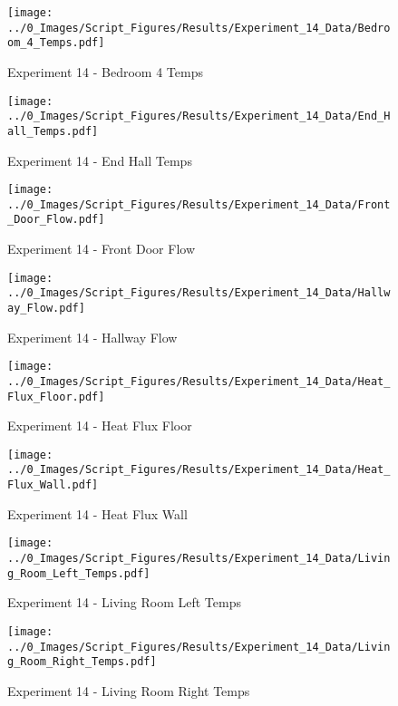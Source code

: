 	\begin{figure}[H]
		\centering
		\texttt{[image: ../0\_Images/Script\_Figures/Results/Experiment\_14\_Data/Bedroom\_4\_Temps.pdf]}
		\caption[]{Experiment 14 - Bedroom 4 Temps}
	\end{figure}
 
	\clearpage

	\begin{figure}[H]
		\centering
		\texttt{[image: ../0\_Images/Script\_Figures/Results/Experiment\_14\_Data/End\_Hall\_Temps.pdf]}
		\caption[]{Experiment 14 - End Hall Temps}
	\end{figure}
 

	\begin{figure}[H]
		\centering
		\texttt{[image: ../0\_Images/Script\_Figures/Results/Experiment\_14\_Data/Front\_Door\_Flow.pdf]}
		\caption[]{Experiment 14 - Front Door Flow}
	\end{figure}
 
	\clearpage

	\begin{figure}[H]
		\centering
		\texttt{[image: ../0\_Images/Script\_Figures/Results/Experiment\_14\_Data/Hallway\_Flow.pdf]}
		\caption[]{Experiment 14 - Hallway Flow}
	\end{figure}
 

	\begin{figure}[H]
		\centering
		\texttt{[image: ../0\_Images/Script\_Figures/Results/Experiment\_14\_Data/Heat\_Flux\_Floor.pdf]}
		\caption[]{Experiment 14 - Heat Flux Floor}
	\end{figure}
 
	\clearpage

	\begin{figure}[H]
		\centering
		\texttt{[image: ../0\_Images/Script\_Figures/Results/Experiment\_14\_Data/Heat\_Flux\_Wall.pdf]}
		\caption[]{Experiment 14 - Heat Flux Wall}
	\end{figure}
 

	\begin{figure}[H]
		\centering
		\texttt{[image: ../0\_Images/Script\_Figures/Results/Experiment\_14\_Data/Living\_Room\_Left\_Temps.pdf]}
		\caption[]{Experiment 14 - Living Room Left Temps}
	\end{figure}
 
	\clearpage

	\begin{figure}[H]
		\centering
		\texttt{[image: ../0\_Images/Script\_Figures/Results/Experiment\_14\_Data/Living\_Room\_Right\_Temps.pdf]}
		\caption[]{Experiment 14 - Living Room Right Temps}
	\end{figure}
 

